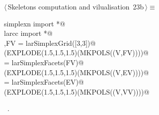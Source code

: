 \documentclass[11pt,oneside]{article}	%
\begin{document}
\begin{flushleft} \small
\begin{minipage}{\linewidth} \label{scrap56}
\protect{}$\langle\,$Skeletons computation and vilualisation\nobreak\ {\footnotesize 23b}$\,\rangle\equiv$
\vspace{-1ex}
\begin{list}{}{} \item
\mbox{}\verb@from simplexn import *@\\
\mbox{}\verb@from larcc import *@\\
\mbox{}\verb@V,FV = larSimplexGrid([3,3])@\\
\mbox{}\verb@VIEW(EXPLODE(1.5,1.5,1.5)(MKPOLS((V,FV))))@\\
\mbox{}\verb@EV = larSimplexFacets(FV)@\\
\mbox{}\verb@VIEW(EXPLODE(1.5,1.5,1.5)(MKPOLS((V,EV))))@\\
\mbox{}\verb@VV = larSimplexFacets(EV)@\\
\mbox{}\verb@VIEW(EXPLODE(1.5,1.5,1.5)(MKPOLS((V,VV))))@\\
\mbox{}\verb@@{\NWsep}
\end{list}
\vspace{-1ex}
\footnotesize\addtolength{\baselineskip}{-1ex}
\begin{list}{}{\setlength{\itemsep}{-\parsep}\setlength{\itemindent}{-\leftmargin}}
\item \NWtxtMacroRefIn\ .
\end{list}
\end{minipage}\\[4ex]
\end{flushleft}
\end{document}
